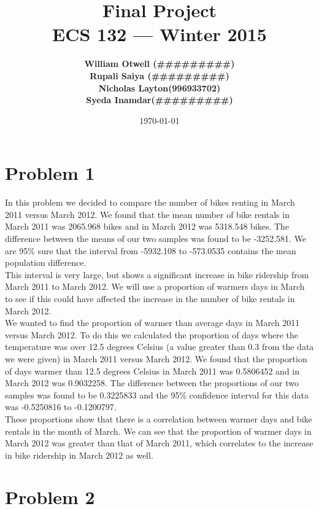 \documentclass[11pt]{article}
\title{\vspace{-3ex}\bf Final Project\\[2ex] 
       \normalsize ECS 132 --- Winter 2015}
\date{\today}
\author{\bf William Otwell (\#\#\#\#\#\#\#\#\#)\\ \bf Rupali Saiya (\#\#\#\#\#\#\#\#\#)\\ \bf Nicholas Layton(996933702)\\ \bf Syeda Inamdar(\#\#\#\#\#\#\#\#\#)\\}
\begin{document}
\maketitle
\pagebreak
\tableofcontents
\pagebreak

\section{Problem 1}

In this problem we decided to compare the number of bikes renting in March 2011 versus March 2012. We found that the mean number of bike rentals in March 2011 was 2065.968 bikes and in March 2012 was 5318.548 bikes. The difference between the means of our two samples was found to be -3252.581. We are  95\% sure that the interval from -5932.108 to -573.0535 contains the mean population difference. 
\\

This interval is very large, but shows a significant increase in bike ridership from March 2011 to March 2012. We will use a proportion of warmers days in March to see if this could have affected the increase in the number of bike rentals in March 2012.
\\

We wanted to find the proportion of warmer than average days in March 2011 versus March 2012. To do this we calculated the proportion of days where the temperature was over 12.5 degrees Celsius (a value greater than 0.3 from the data we were given) in March 2011 versus March 2012. We found that the proportion of days warmer than 12.5 degrees Celsius in March 2011 was 0.5806452 and in March 2012 was 0.9032258. The difference between the proportions of our two samples was found to be 0.3225833 and the 95\% confidence interval for this data was -0.5250816 to -0.1200797. 
\\

These proportions show that there is a correlation between warmer days and bike rentals in the month of March. We can see that the proportion of warmer days in March 2012 was greater than that of March 2011, which correlates to the increase in bike ridership in March 2012 as well.

\pagebreak



\section{Problem 2}
\pagebreak
\end{document}

